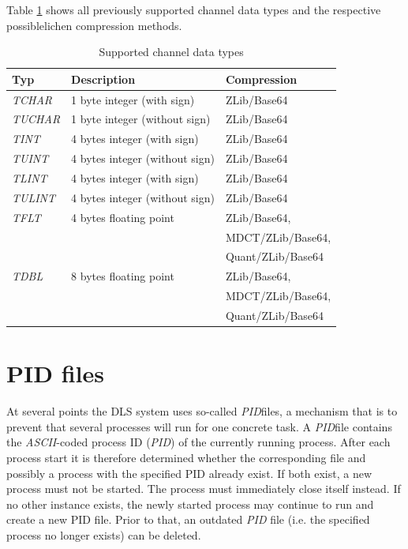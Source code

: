 \documentclass[a4paper,12pt,BCOR6mm,bibtotoc,idxtotoc]{scrbook}
\begin{document}
Table \ref{tab:typen} shows all previously supported channel data types and the respective possible\-lichen  compression methods.

\begin{table}[htb] \centering \caption{Supported channel data types} \label{tab:typen} \vspace{1.5ex} \begin{tabular}[thb]{|l|l|l|} \hline \textbf{Typ} & \textbf{Description} & \textbf{Compression}\\ \hline \textit{TCHAR} & 1 byte integer (with sign) & ZLib/Base64\\ \hline \textit{TUCHAR} & 1 byte integer (without sign) & ZLib/Base64\\ \hline \textit{TINT} & 4 bytes integer (with sign) & ZLib/Base64\\ \hline \textit{TUINT} & 4 bytes integer (without sign) & ZLib/Base64\\ \hline \textit{TLINT} & 4 bytes integer (with sign) & ZLib/Base64\\ \hline \textit{TULINT} & 4 bytes integer (without sign) & ZLib/Base64\\ \hline \textit{TFLT} & 4 bytes floating point & ZLib/Base64,\\ & & MDCT/ZLib/Base64,\\ & & Quant/ZLib/Base64\\ \hline \textit{TDBL} & 8 bytes floating point & ZLib/Base64,\\ & & MDCT/ZLib/Base64,\\ & & Quant/ZLib/Base64\\ \hline \end{tabular} \end{table}


\chapter{PID files} \label{sec:apx_pid}

At several points the DLS system uses so-called \textit{PID}files, a mechanism that is to prevent that several processes will run for one concrete task. A \textit{PID}file contains the \textit{ASCII}-coded process ID (\textit{PID}) of the currently running process. After each process start it is therefore determined whether the corresponding file and possibly a process with the specified PID already exist. If both exist, a new process must not be started. The process must immediately close itself instead. If no other instance exists, the newly started process may continue to run and create a new PID file. Prior to that, an outdated \textit{PID} file (i.e. the specified process no longer exists) can be deleted.
\end{document}
